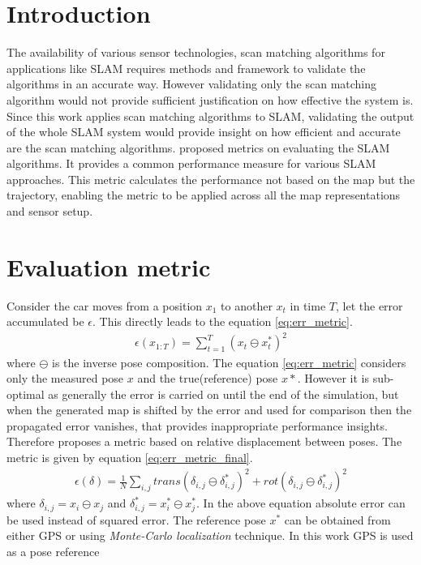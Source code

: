 \section*{Introduction}
    The availability of various sensor technologies, scan matching algorithms for applications like SLAM requires methods and framework to validate the algorithms in an accurate way. However validating only the scan matching algorithm would not provide sufficient justification on how effective the system is. Since this work applies scan matching algorithms to SLAM, validating the output of the whole SLAM system would provide insight on how efficient and accurate are the scan matching algorithms. \cite{kuemmerle09auro} proposed metrics on evaluating the SLAM algorithms. It provides a common performance measure for various SLAM approaches. This metric calculates the performance not based on the map but the trajectory, enabling the metric to be applied across all the map representations and sensor setup. 

\section{Evaluation metric}
Consider the car moves from a position ${x_1}$  to another ${x_t}$ in time $T$, let the error accumulated be $\epsilon$. This directly leads to the equation \ref{eq:err_metric}.
\begin{gather} \label{eq:err_metric}
    \epsilon(x_{1:T}) = \sum^T_{t=1}{(x_t \ominus x_t^*)^2}
\end{gather}
where $\ominus$ is the inverse pose composition. The equation \ref{eq:err_metric} considers only the measured pose $x$ and the true(reference) pose $x*$. However it is sub-optimal \cite{kuemmerle09auro} as generally the error is carried on until the end of the simulation, but when the generated map is shifted by the error and used for comparison then the propagated error vanishes, that provides inappropriate performance insights. 
Therefore \cite{kuemmerle09auro} proposes a metric based on relative displacement between poses. The metric is given by equation \ref{eq:err_metric_final}. 
\begin{gather} \label{eq:err_metric_final}
    \epsilon(\delta) = \frac{1}{N}\sum_{i,j}{trans(\delta_{i,j} \ominus \delta_{i,j}^*)^2 + rot(\delta_{i,j} \ominus \delta_{i,j}^*)^2}
\end{gather}
where $\delta_{i,j} = x_i \ominus x_j$ and $\delta_{i,j}^* = x_i^* \ominus x_j^*$. In the above equation absolute error can be used instead of squared error. The reference pose $x^*$ can be obtained from either GPS or using \textit{Monte-Carlo localization} technique. In this work GPS is used as a pose reference

